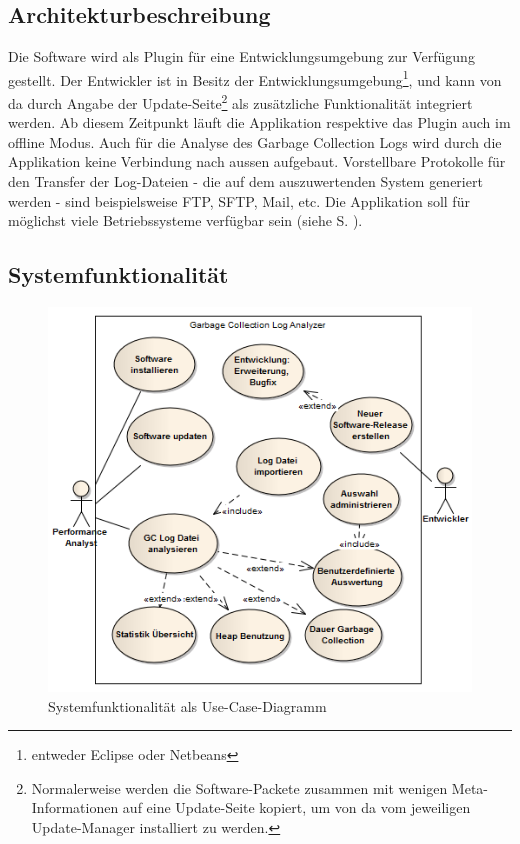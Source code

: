 \subsection{Architekturbeschreibung}
Die Software wird als Plugin für eine Entwicklungsumgebung zur Verfügung gestellt. Der Entwickler ist in Besitz der Entwicklungsumgebung\footnote{entweder Eclipse oder Netbeans}, und kann von da durch Angabe der Update-Seite\footnote{Normalerweise werden die Software-Packete zusammen mit wenigen Meta-Informationen auf eine Update-Seite kopiert, um von da vom jeweiligen Update-Manager installiert zu werden.} als zusätzliche Funktionalität integriert werden. Ab diesem Zeitpunkt läuft die Applikation respektive das Plugin auch im offline Modus. Auch für die Analyse des Garbage Collection Logs wird durch die Applikation keine Verbindung nach aussen aufgebaut. Vorstellbare Protokolle für den Transfer der Log-Dateien - die auf dem auszuwertenden System generiert werden - sind beispielsweise FTP, SFTP, Mail, etc. Die Applikation soll für möglichst viele Betriebssysteme verfügbar sein (siehe  S. \pageref{req_plattformunabhaengig}).
\subsection{Systemfunktionalität}\label{systemfunktionalitaet}
 \begin{figure}[H]
  	\centering
    	\includegraphics[width=15cm]{images/anforderungen_use-case}
        	\caption{Systemfunktionalität als Use-Case-Diagramm}
\end{figure}

